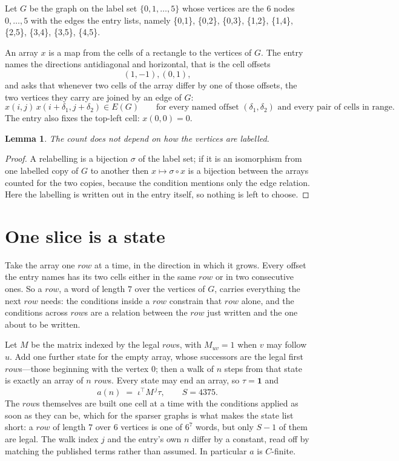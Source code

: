 \documentclass[11pt,a4paper]{article}
\theoremstyle{plain}
\newtheorem{lemma}[theorem]{Lemma}
\theoremstyle{definition}
\begin{document}
Let $G$ be the graph on the label set $\{0,1,\dots,5\}$ whose vertices are the $6$ nodes $0,\dots,5$ with the edges the entry lists, namely \{0,1\}, \{0,2\}, \{0,3\}, \{1,2\}, \{1,4\}, \{2,5\}, \{3,4\}, \{3,5\}, \{4,5\}.

An array $x$ is a map from the cells of a rectangle to the vertices of $G$. The entry names the
directions antidiagonal and horizontal, that is the cell offsets
\[
(1,-1), (0,1),
\]
and asks that whenever two cells of the array differ by one of those offsets, the two vertices
they carry are joined by an edge of $G$:
\[
x(i,j)\,x(i+\delta_1,j+\delta_2)\in E(G)\qquad
\text{for every named offset } (\delta_1,\delta_2)\text{ and every pair of cells in range.}
\]
The entry also fixes the top-left cell: $x(0,0)=0$.

\begin{lemma}\label{lem:label}
The count does not depend on how the vertices are labelled.
\end{lemma}

\begin{proof}
A relabelling is a bijection $\sigma$ of the label set; if it is an isomorphism from one
labelled copy of $G$ to another then $x\mapsto\sigma\circ x$ is a bijection between the arrays
counted for the two copies, because the condition mentions only the edge relation.
Here the labelling is written out in the entry itself, so nothing is left to choose.
\end{proof}

\section{One slice is a state}

Take the array one $row$ at a time, in the direction in which it grows.
Every offset the entry names has its two cells either in the same $row$ or in two
consecutive ones. So a $row$, a word of length $7$ over the vertices of $G$, carries
everything the next $row$ needs: the conditions inside a $row$ constrain that
$row$ alone, and the conditions across $row$s are a relation between the
$row$ just written and the one about to be written.

Let $M$ be the matrix indexed by the legal $row$s, with $M_{uv}=1$ when $v$ may
follow $u$. Add one further state for the empty array, whose successors are the legal first
$row$s---those beginning with the vertex $0$; then a walk of
$n$ steps from that state is exactly an array of $n$ $row$s. Every state may end an
array, so $\tau=\mathbf{1}$ and
\[
a(n)\;=\;\iota^{\!\top}M^{\,j}\tau ,\qquad S=4375.
\]
The $row$s themselves are built one cell at a time with the conditions applied as soon
as they can be, which for the sparser graphs is what makes the state list short: a $row$
of length $7$ over $6$ vertices is one of $6^{7}$ words, but only $S-1$ of them are
legal. The walk index $j$ and the entry's own $n$ differ by a constant, read off by matching the
published terms rather than assumed. In particular $a$ is $C$-finite.
\end{document}

